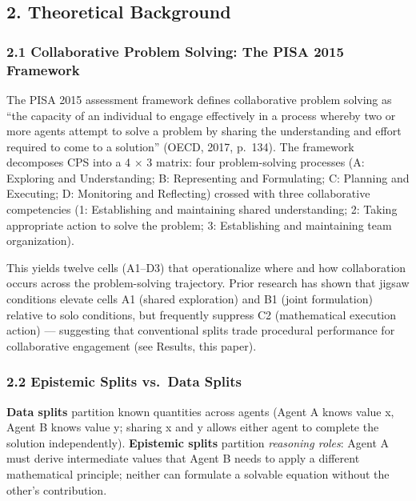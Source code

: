 \documentclass[
  11pt,
]{article}
\begin{document}
\subsection{2. Theoretical Background}\label{theoretical-background}

\subsubsection{2.1 Collaborative Problem Solving: The PISA 2015
Framework}\label{collaborative-problem-solving-the-pisa-2015-framework}

The PISA 2015 assessment framework defines collaborative problem solving
as ``the capacity of an individual to engage effectively in a process
whereby two or more agents attempt to solve a problem by sharing the
understanding and effort required to come to a solution'' (OECD, 2017,
p.~134). The framework decomposes CPS into a 4 $\times$ 3 matrix: four
problem-solving processes (A: Exploring and Understanding; B:
Representing and Formulating; C: Planning and Executing; D: Monitoring
and Reflecting) crossed with three collaborative competencies (1:
Establishing and maintaining shared understanding; 2: Taking appropriate
action to solve the problem; 3: Establishing and maintaining team
organization).

This yields twelve cells (A1--D3) that operationalize where and how
collaboration occurs across the problem-solving trajectory. Prior
research has shown that jigsaw conditions elevate cells A1 (shared
exploration) and B1 (joint formulation) relative to solo conditions, but
frequently suppress C2 (mathematical execution action) --- suggesting
that conventional splits trade procedural performance for collaborative
engagement (see Results, this paper).

\subsubsection{2.2 Epistemic Splits vs.~Data
Splits}\label{epistemic-splits-vs.-data-splits}

\textbf{Data splits} partition known quantities across agents (Agent A
knows value x, Agent B knows value y; sharing x and y allows either
agent to complete the solution independently). \textbf{Epistemic splits}
partition \emph{reasoning roles}: Agent A must derive intermediate
values that Agent B needs to apply a different mathematical principle;
neither can formulate a solvable equation without the other's
contribution.
\end{document}
